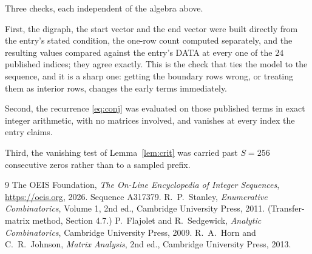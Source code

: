 \documentclass[11pt,a4paper]{article}
\theoremstyle{plain}
\theoremstyle{definition}
\begin{document}
Three checks, each independent of the algebra above.

First, the digraph, the start vector and the end vector were built directly from the
entry's stated condition, the one-row count computed separately, and the resulting values
compared against the entry's DATA at every one of the $24$ published indices; they
agree exactly. This is the check that ties the model to the sequence, and it is a sharp one:
getting the boundary rows wrong, or treating them as interior rows, changes the early terms
immediately.

Second, the recurrence \eqref{eq:conj} was evaluated on those published terms in exact
integer arithmetic, with no matrices involved, and vanishes at every index the entry claims.

Third, the vanishing test of Lemma~\ref{lem:crit} was carried past $S=256$ consecutive
zeros rather than to a sampled prefix.

\begin{thebibliography}{9}
 The OEIS Foundation, \emph{The On-Line Encyclopedia of Integer
Sequences}, \url{https://oeis.org}, 2026. Sequence A317379.
 R.~P.~Stanley, \emph{Enumerative Combinatorics}, Volume 1, 2nd ed.,
Cambridge University Press, 2011. (Transfer-matrix method, Section 4.7.)
 P.~Flajolet and R.~Sedgewick, \emph{Analytic Combinatorics}, Cambridge
University Press, 2009.
 R.~A.~Horn and C.~R.~Johnson, \emph{Matrix Analysis}, 2nd ed., Cambridge
University Press, 2013.
\end{thebibliography}
\end{document}
